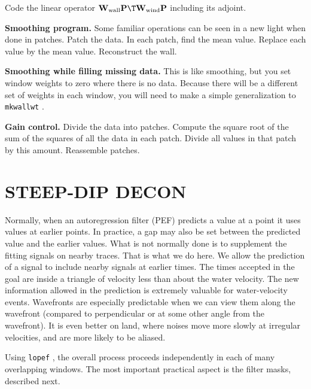 \begin{exer}
\item
        Code the linear operator
        $ \bold W_{\rm wall} \bold P\T \bold W_{\rm wind} \bold P $
        including its adjoint.
\item
        {\bf Smoothing program.}
        Some familiar operations can be seen in a new light when done in patches.
        Patch the data.
        In each patch,
        find the mean value.
        Replace each value by the mean value.
        Reconstruct the wall.
\item
        {\bf Smoothing while filling missing data.}
        This is like smoothing,
        but you set window weights to zero where there is no data.
        Because there will be a
        different set of weights in each window,
        you will need to make a simple generalization to \texttt{mkwallwt} .
\item
        {\bf Gain control.}
        Divide the data into patches.
        Compute the square root of the sum of the squares
        of all the data in each patch.
        Divide all values in that patch by this amount.
        Reassemble patches.
\end{exer}

\section{STEEP-DIP DECON}
\par
Normally,
when
an autoregression filter (PEF) predicts
a value at a point it uses values at earlier points.
In practice,
a gap may also be set between the predicted value
and the earlier values.
What is not normally done is to supplement the fitting
signals on nearby traces.
That is what we do here.
We allow the prediction of a signal to include nearby signals
at earlier times.
The times accepted in the goal are inside a triangle of velocity
less than about the water velocity.
The new information allowed in the prediction
is extremely valuable for water-velocity events.
Wavefronts are especially predictable
when we can view them along the wavefront
(compared to perpendicular or at some other angle from the wavefront).
It is even better on land,
where noises move more slowly at irregular velocities,
and are more likely to be aliased.

\par
Using \texttt{lopef} ,
the overall process proceeds independently
in each of many overlapping windows.
The most important practical aspect is the filter masks, described next.

